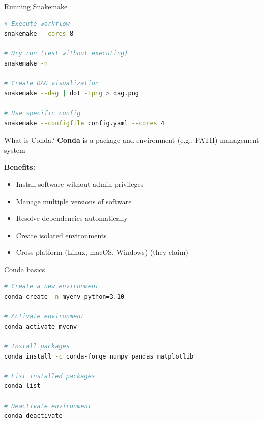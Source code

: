 \documentclass[aspectratio=169]{beamer}
\begin{document}
\begin{frame}[fragile]{Running Snakemake}
    \begin{lstlisting}[language=bash]
# Execute workflow
snakemake --cores 8

# Dry run (test without executing)
snakemake -n

# Create DAG visualization
snakemake --dag | dot -Tpng > dag.png

# Use specific config
snakemake --configfile config.yaml --cores 4
\end{lstlisting}
\end{frame}


\begin{frame}{What is Conda?}
    \textbf{Conda} is a package and environment (e.g., PATH) management system
    
    \vspace{0.5cm}
    \textbf{Benefits:}
    \begin{itemize}
        \item Install software without admin privileges
        \item Manage multiple versions of software
        \item Resolve dependencies automatically
        \item Create isolated environments
        \item Cross-platform (Linux, macOS, Windows) (they claim)
    \end{itemize}
    
\end{frame}

\begin{frame}[fragile]{Conda basics}
    \begin{lstlisting}[language=bash]
# Create a new environment
conda create -n myenv python=3.10

# Activate environment
conda activate myenv

# Install packages
conda install -c conda-forge numpy pandas matplotlib

# List installed packages
conda list

# Deactivate environment
conda deactivate
\end{lstlisting}
\end{frame}
\end{document}

